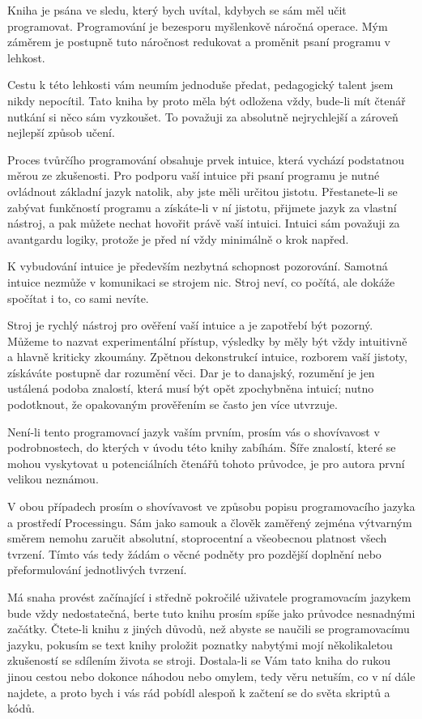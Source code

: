 \documentclass[10pt]{book}
\begin{document}
Kniha je psána ve sledu, který bych uvítal, kdybych se sám měl učit programovat. Programování je bezesporu myšlenkově náročná operace. Mým záměrem je postupně tuto náročnost redukovat a proměnit psaní programu v lehkost.

Cestu k této lehkosti vám neumím jednoduše předat, pedagogický talent jsem nikdy nepocítil. Tato kniha by proto měla být odložena vždy, bude-li mít čtenář nutkání si něco sám vyzkoušet. To považuji za absolutně nejrychlejší a zároveň nejlepší způsob učení.

Proces tvůrčího programování obsahuje prvek intuice, která vychází podstatnou měrou ze zkušenosti. Pro podporu vaší intuice při psaní programu je nutné ovládnout základní jazyk natolik, aby jste měli určitou jistotu. Přestanete-li se zabývat funkčností programu a získáte-li v ní jistotu, přijmete jazyk za vlastní nástroj, a pak můžete nechat hovořit právě vaší intuici. Intuici sám považuji za avantgardu logiky, protože je před ní vždy minimálně o krok napřed.

K vybudování intuice je především nezbytná schopnost pozorování. Samotná intuice nezmůže v komunikaci se strojem nic. Stroj neví, co počítá, ale dokáže spočítat i to, co sami nevíte.

Stroj je rychlý nástroj pro ověření vaší intuice a je zapotřebí být pozorný. Můžeme to nazvat experimentální přístup, výsledky by měly být vždy intuitivně a hlavně kriticky zkoumány. Zpětnou dekonstrukcí intuice, rozborem vaší jistoty, získáváte postupně dar rozumění věci. Dar je to danajský, rozumění je jen ustálená podoba znalostí, která musí být opět zpochybněna intuicí; nutno podotknout, že opakovaným prověřením se často jen více utvrzuje. 

Není-li tento programovací jazyk vaším prvním, prosím vás o shovívavost v podrobnostech, do kterých v úvodu této knihy zabíhám. Šíře znalostí, které se mohou vyskytovat u potenciálních čtenářů tohoto průvodce, je pro autora první velikou neznámou.

V obou případech prosím o shovívavost ve způsobu popisu programovacího jazyka a prostředí Processingu. Sám jako samouk a člověk zaměřený zejména výtvarným směrem nemohu zaručit absolutní, stoprocentní a všeobecnou platnost všech tvrzení. Tímto vás tedy žádám o věcné podněty pro pozdější doplnění nebo přeformulování jednotlivých tvrzení.

Má snaha provést začínající i středně pokročilé uživatele programovacím jazykem bude vždy nedostatečná, berte tuto knihu prosím spíše jako průvodce nesnadnými začátky. Čtete-li knihu z jiných důvodů, než abyste se naučili se programovacímu jazyku, pokusím se text knihy proložit poznatky nabytými mojí několikaletou zkušeností se sdílením života se stroji. Dostala-li se Vám tato kniha do rukou jinou cestou nebo dokonce náhodou nebo omylem, tedy věru netuším, co v ní dále najdete, a proto bych i vás rád pobídl alespoň k začtení se do světa skriptů a kódů.
\end{document}
